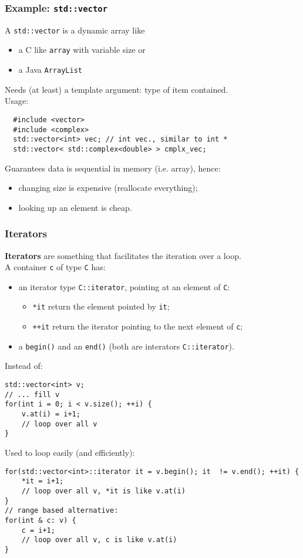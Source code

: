 \documentclass{beamer}
\newcommand{\code}[1]{{\color{cgreen}\texttt{#1}}}
\begin{document}
\begin{frame}[fragile]
 \frametitle{Example: \code{std::vector}}
 A \code{std::vector} is a dynamic array like
 \begin{itemize}
  \item a C like \code{array} with variable size or
  \item a Java \code{ArrayList}
 \end{itemize}
 Needs (at least) a template argument: type of item contained. \\
 Usage:
 \begin{lstlisting}
  #include <vector>
  #include <complex>
  std::vector<int> vec; // int vec., similar to int *
  std::vector< std::complex<double> > cmplx_vec;
 \end{lstlisting}

 Guarantees data is sequential in memory (i.e. array), hence:
 \begin{itemize}
  \item changing size is expensive (reallocate everything);
  \item looking up an element is cheap.
 \end{itemize}
\end{frame}

\begin{frame}
 \frametitle{Iterators}
 \textbf{Iterators} are something that facilitates the iteration over a loop. \\
 A container \code{c} of type \code{C} has:
 \begin{itemize}
  \item an iterator type \code{C::iterator}, pointing at an element of \code{C}:
  \begin{itemize}
   \item \code{*it} return the element pointed by \code{it};
   \item \code{++it} return the iterator pointing to the next element of \code{c};
  \end{itemize}
  \item a \code{begin()} and an \code{end()} (both are interators \code{C::iterator}).
 \end{itemize}
 Instead of:
 \begin{lstlisting}
std::vector<int> v;
// ... fill v
for(int i = 0; i < v.size(); ++i) {
    v.at(i) = i+1;
    // loop over all v
}
 \end{lstlisting}
 Used to loop easily (and efficiently):
 \begin{lstlisting}
for(std::vector<int>::iterator it = v.begin(); it  != v.end(); ++it) {
    *it = i+1;
    // loop over all v, *it is like v.at(i)
}
// range based alternative:
for(int & c: v) {
    c = i+1;
    // loop over all v, c is like v.at(i)
}
 \end{lstlisting}

\end{frame}
\end{document}
